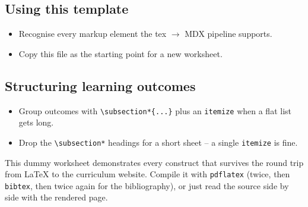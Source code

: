 \documentclass[11pt]{article}
\begin{document}
\begin{learningoutcomes}
  \subsection*{Using this template}
  \begin{itemize}
    \item Recognise every markup element the tex $\to$ MDX pipeline supports.
    \item Copy this file as the starting point for a new worksheet.
  \end{itemize}

  \subsection*{Structuring learning outcomes}
  \begin{itemize}
    \item Group outcomes with \verb|\subsection*{...}| plus an \verb|itemize| when a flat list gets long.
    \item Drop the \verb|\subsection*| headings for a short sheet -- a single \verb|itemize| is fine.
  \end{itemize}
\end{learningoutcomes}

This dummy worksheet demonstrates every construct that survives the round trip
from \LaTeX{} to the curriculum website. Compile it with \texttt{pdflatex}
(twice, then \texttt{bibtex}, then twice again for the bibliography), or just
read the source side by side with the rendered page.
\end{document}
